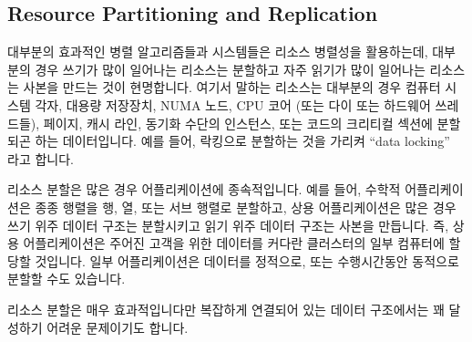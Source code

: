 \subsection{Resource Partitioning and Replication}
\label{sec:Resource Partitioning and Replication}

대부분의 효과적인 병렬 알고리즘들과 시스템들은 리소스 병렬성을 활용하는데,
대부분의 경우 쓰기가 많이 일어나는 리소스는 분할하고 자주 읽기가 많이
일어나는 리소스는 사본을 만드는 것이 현명합니다.
여기서 말하는 리소스는 대부분의 경우 컴퓨터 시스템 각자, 대용량 저장장치, NUMA
노드, CPU 코어 (또는 다이 또는 하드웨어 쓰레드들), 페이지, 캐시 라인, 동기화
수단의 인스턴스, 또는 코드의 크리티컬 섹션에 분할되곤 하는 데이터입니다.
예를 들어, 락킹으로 분할하는 것을 가리켜 ``data locking''~\cite{Beck85} 라고
합니다.

리소스 분할은 많은 경우 어플리케이션에 종속적입니다.
예를 들어, 수학적 어플리케이션은 종종 행렬을 행, 열, 또는 서브 행렬로 분할하고,
상용 어플리케이션은 많은 경우 쓰기 위주 데이터 구조는 분할시키고 읽기 위주
데이터 구조는 사본을 만듭니다.
즉, 상용 어플리케이션은 주어진 고객을 위한 데이터를 커다란 클러스터의 일부
컴퓨터에 할당할 것입니다.
일부 어플리케이션은 데이터를 정적으로, 또는 수행시간동안 동적으로 분할할 수도
있습니다.

리소스 분할은 매우 효과적입니다만 복잡하게 연결되어 있는 데이터 구조에서는 꽤
달성하기 어려운 문제이기도 합니다.

